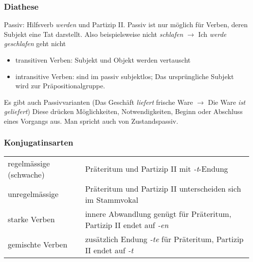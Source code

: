 \subsubsection{Diathese}
Passiv: Hilfsverb \textit{werden} und Partizip II. Passiv ist nur möglich für Verben, deren Subjekt eine Tat darstellt.
Also beispielsweise nicht \textit{schlafen} $\rightarrow$ Ich \textit{werde geschlafen} geht nicht
\begin{itemize}\itemsep0em
	\item transitiven Verben: Subjekt und Objekt werden vertauscht
	\item intransitive Verben: sind im passiv subjektlos; Das ursprüngliche Subjekt wird zur Präpositionalgruppe.
\end{itemize}

Es gibt auch Passivvarianten (Das Geschäft \textit{liefert} frische Ware $\rightarrow$ Die Ware \textit{ist geliefert})
Diese drücken Möglichkeiten, Notwendigkeiten, Beginn oder Abschluss eines Vorgangs aus. Man spricht auch von Zustandspassiv.

\subsubsection{Konjugatinsarten}
\settowidth{\MyLenA}{regelmässige (schwache)~~}
\begin{tabular}{@{}p{\the\MyLenA}%
				@{}p{\linewidth-\the\MyLenA}}
	regelmässige (schwache) & Präteritum und Partizip II mit \textit{-t}-Endung\\
	unregelmässige & Präteritum und Partizip II unterscheiden sich im Stammvokal\\
	starke Verben & innere Abwandlung genügt für Präteritum, Partizip II endet auf \textit{-en}\\
	gemischte Verben & zusätzlich Endung \textit{-te} für Präteritum, Partizip II endet auf \textit{-t}
\end{tabular}